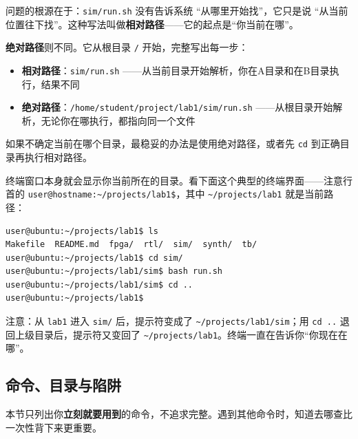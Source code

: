 \documentclass[11pt,a4paper]{article}
\begin{document}
问题的根源在于：\texttt{sim/run.sh} 没有告诉系统 ``从哪里开始找''，它只是说 ``从当前位置往下找''。这种写法叫做\textbf{相对路径}——它的起点是``你当前在哪''。

\textbf{绝对路径}则不同。它从根目录 \texttt{/} 开始，完整写出每一步：

\begin{itemize}
  \item \textbf{相对路径}：\texttt{sim/run.sh} ——从当前目录开始解析，你在A目录和在B目录执行，结果不同
  \item \textbf{绝对路径}：\texttt{/home/student/project/lab1/sim/run.sh} ——从根目录开始解析，无论你在哪执行，都指向同一个文件
\end{itemize}

如果不确定当前在哪个目录，最稳妥的办法是使用绝对路径，或者先 \texttt{cd} 到正确目录再执行相对路径。

\begin{warnbox}
终端窗口本身就会显示你当前所在的目录。看下面这个典型的终端界面——注意行首的 \texttt{user@hostname:\textasciitilde/projects/lab1\$}，其中 \texttt{\textasciitilde/projects/lab1} 就是当前路径：

\begin{lstlisting}[style=shell]
user@ubuntu:~/projects/lab1$ ls
Makefile  README.md  fpga/  rtl/  sim/  synth/  tb/
user@ubuntu:~/projects/lab1$ cd sim/
user@ubuntu:~/projects/lab1/sim$ bash run.sh
user@ubuntu:~/projects/lab1/sim$ cd ..
user@ubuntu:~/projects/lab1$
\end{lstlisting}

注意：从 \texttt{lab1} 进入 \texttt{sim/} 后，提示符变成了 \texttt{\textasciitilde/projects/lab1/sim}；用 \texttt{cd ..} 退回上级目录后，提示符又变回了 \texttt{\textasciitilde/projects/lab1}。终端一直在告诉你``你现在在哪''。
\end{warnbox}

\subsection{命令、目录与陷阱}

本节只列出你\textbf{立刻就要用到}的命令，不追求完整。遇到其他命令时，知道去哪查比一次性背下来更重要。
\end{document}
